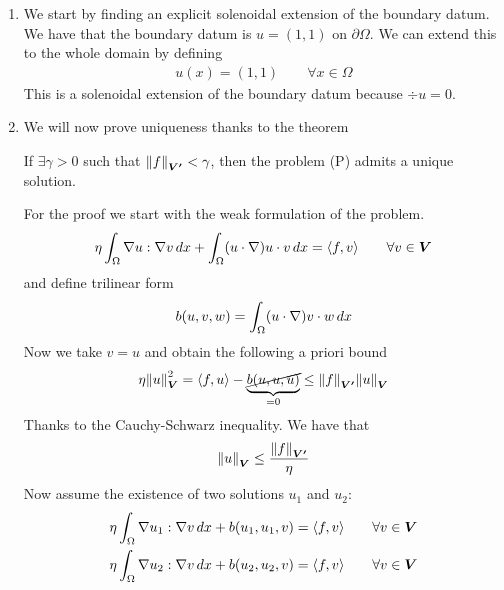 \begin{enumerate}
    \item We start by finding an explicit solenoidal extension of the boundary datum. We have that the boundary datum is \(u = (1,1)\) on \(\partial\Omega\). We can extend this to the whole domain by defining
    \[
        \begin{split}
            u(x) = (1,1) \qquad \forall x \in \Omega
        \end{split}
    \]
    This is a solenoidal extension of the boundary datum because \(\div u = 0\). 
    \item We will now prove uniqueness thanks to the theorem
    \begin{remark}
        If \(\exists \gamma > 0\) such that \(\norm{f}_{\bm{V'}} < \gamma\), then the problem (P) admits a unique solution.
    \end{remark}
    For the proof we start with the weak formulation of the problem. 
    \[
        \begin{split}
            \eta \int_\Omega \nabla u : \nabla v \, dx + \int_\Omega (u \cdot \nabla) u \cdot v \, dx = \langle f, v \rangle \qquad \forall v \in \bm{V}
        \end{split}
    \]
    and define trilinear form
    \[
        \begin{split}
            b(u, v, w) = \int_\Omega (u \cdot \nabla) v \cdot w \, dx
        \end{split}
    \]
    Now we take \(v = u\) and obtain the following a priori bound
    \[
        \begin{split}
            \eta \norm{u}_{\bm{V}}^2 = \langle f, u \rangle - \underbrace{\cancel{b(u, u, u)}}_{=0} \leq \norm{f}_{\bm{V'}} \norm{u}_{\bm{V}} 
        \end{split}
    \]
    Thanks to the Cauchy-Schwarz inequality. We have that 
    \[
        \begin{split}
            \norm{u}_{\bm{V}} \leq \frac{\norm{f}_{\bm{V'}}}{\eta}
        \end{split}
    \]
    Now assume the existence of two solutions \(u_1\) and \(u_2\):
    \begin{align*}
        \eta \int_\Omega \nabla u_1 : \nabla v \, dx + b(u_1, u_1, v) &= \langle f, v \rangle \qquad \forall v \in \bm{V} \\
        \eta \int_\Omega \nabla u_2 : \nabla v \, dx + b(u_2, u_2, v) &= \langle f, v \rangle \qquad \forall v \in \bm{V}
    \end{align*}

\end{enumerate}
